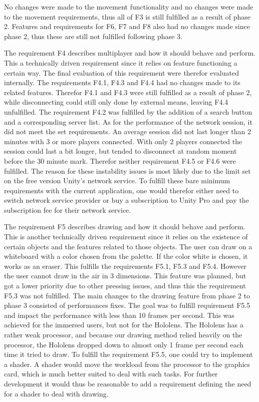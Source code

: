         No changes were made to the movement functionality and no changes were made to the movement requirements, thus all of F3 is still fulfilled as a result of phase 2. Features and requirements for F6, F7 and F8 also had no changes made since phase 2, thus these are still not fulfilled following phase 3.
        
        The requirement F4 describes multiplayer and how it should behave and perform. This a technically driven requirement since it relies on feature functioning a certain way. The final evaluation of this requirement were therefor evaluated internally. The requirements F4.1, F4.3 and F4.4 had no changes made to its related features. Therefor F4.1 and F4.3 were still fulfilled as a result of phase 2, while disconnecting could still only done by external means, leaving F4.4 unfulfilled. The requirement F4.2 was fulfilled by the addition of a search button and a corresponding server list. As for the performance of the network session, it did not meet the set requirements. An average session did not last longer than 2 minutes with 3 or more players connected. With only 2 players connected the session could last a bit longer, but tended to disconnect at random moment before the 30 minute mark. Therefor neither requirement F4.5 or F4.6 were fulfilled. The reason for these instability issues is most likely due to the limit set on the free version Unity's network service. To fulfill these bare minimum requirements with the current application, one would therefor either need to switch network service provider or buy a subscription to Unity Pro and pay the subscription fee for their network service.
        
        The requirement F5 describes drawing and how it should behave and perform. This is another technically driven requirement since it relies on the existence of certain objects and the features related to those objects. The user can draw on a whiteboard with a color chosen from the palette. If the color white is chosen, it works as an eraser. This fulfills the requirements F5.1, F5.3 and F5.4. However the user cannot draw in the air in 3 dimensions. This feature was planned, but got a lower priority due to other pressing issues, and thus this the requirement F5.3 was not fulfilled. The main changes to the drawing feature from phase 2 to phase 3 consisted of performances fixes. The goal was to fulfill requirement F5.5 and impact the performance with less than 10 frames per second. This was achieved for the immersed users, but not for the Hololens. The Hololens has a rather weak processor, and because our drawing method relied heavily on the processor, the Hololens dropped down to almost only 1 frame per second each time it tried to draw. To fulfill the requirement F5.5, one could try to implement a shader. A shader would move the workload from the processor to the graphics card, which is much better suited to deal with such tasks. For further development it would thus be reasonable to add a requirement defining the need for a shader to deal with drawing.
        
